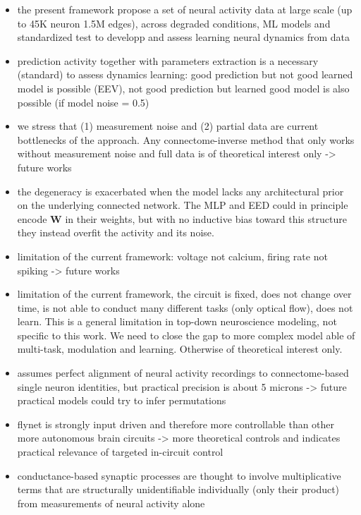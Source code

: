 \documentclass{article}
\begin{document}
\begin{itemize}
\item the present framework propose a set of neural activity data at large scale (up to 45K neuron 1.5M edges), across degraded conditions, ML models and standardized test to developp and assess learning neural dynamics from data
\item prediction activity together with parameters extraction is a necessary (standard) to assess dynamics learning: good prediction but not good learned model is possible (EEV), not good prediction but learned good model is also possible (if model noise = 0.5)

\item we stress that (1) measurement noise and (2) partial data are current bottlenecks of the approach. Any connectome-inverse method that only works without measurement noise and full data is of theoretical interest only -> future works

\item the degeneracy is exacerbated when the model lacks any architectural prior on the underlying connected network. The MLP and EED could in principle encode $\mathbf{W}$ in their weights, but with no inductive bias toward this structure they instead overfit the activity and its noise.

\item limitation of the current framework: voltage not calcium, firing rate not spiking -> future works

\item limitation of the current framework, the circuit is fixed, does not change over time, is not able to conduct many different tasks (only optical flow), does not learn. This is a general limitation in top-down neuroscience modeling, not specific to this work. We need to close the gap to more complex model able of multi-task, modulation and learning. Otherwise of theoretical interest only.

\item assumes perfect alignment of neural activity recordings to connectome-based single neuron identities, but practical precision is about 5 microns -> future practical models could try to infer permutations

\item flynet is strongly input driven and therefore more controllable than other more autonomous brain circuits -> more theoretical controls and indicates practical relevance of targeted in-circuit control

\item conductance-based synaptic processes are thought to involve multiplicative terms that are structurally unidentifiable individually (only their product) from measurements of neural activity alone


\end{itemize}
\end{document}
